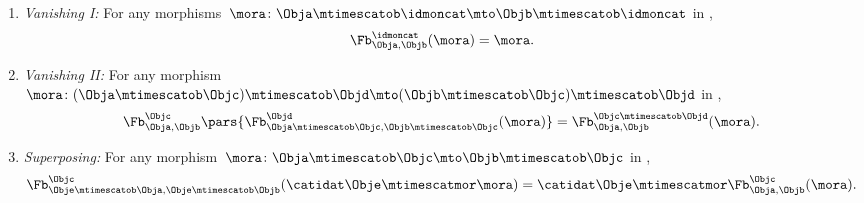 \begin{ctdefinition}
\begin{enumerate}
        \item \emph{Vanishing I:}
              For any morphisms~$\mora \colon \Obja \mtimescatob \idmoncat \mto \Objb \mtimescatob \idmoncat$ in \CatC,
              \begin{equation}
                  \label{eq:feedback-vanishing_1}
                  \Fb_{\Obja,\Objb}^\idmoncat (\mora)=  \mora.
              \end{equation}
        \item \emph{Vanishing II:}
              For any morphism~$\mora \colon (\Obja\mtimescatob \Objc) \mtimescatob \Objd \mto (\Objb\mtimescatob \Objc) \mtimescatob \Objd$ in \CatC,
              \begin{equation}
                  \label{eq:feedback-vanishing_2}
                  \Fb_{\Obja,\Objb}^\Objc\pars{
                      \Fb_{\Obja \mtimescatob \Objc, \Objb \mtimescatob \Objc}^\Objd(\mora)} = \Fb_{\Obja,\Objb}^{\Objc\mtimescatob \Objd}( \mora).
              \end{equation}
        \item \emph{Superposing:}
              For any morphism~$\mora\colon \Obja\mtimescatob \Objc \mto \Objb\mtimescatob \Objc$ in \CatC,
              \begin{equation}
                  \label{eq:feedback-superposing}
                  \Fb_{\Obje\mtimescatob \Obja,\Obje\mtimescatob \Objb}^{\Objc}( \catidat\Obje\mtimescatmor \mora  )=\catidat\Obje\mtimescatmor \Fb_{\Obja,\Objb}^\Objc(\mora).
              \end{equation}
    \end{enumerate}
\end{ctdefinition}

